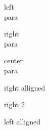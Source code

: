 \documentclass{book}
\begin{document}
\begin{flushleft}
left\\para
\end{flushleft}

\begin{flushright}
right\\para
\end{flushright}

\begin{center}
center\\para
\end{center}


\raggedright
right alligned

right 2

\raggedleft
left alligned


\doublespacing %
\lipsum[1]
\end{document}

